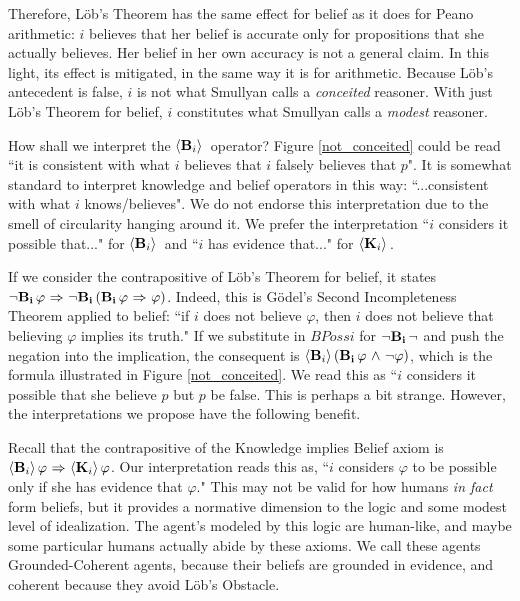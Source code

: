 Therefore, L\"ob's Theorem has the same effect for belief as it does for Peano arithmetic: $i$ believes that her belief is accurate only for propositions that she actually believes. Her belief in her own accuracy is not a general claim. In this light, its effect is mitigated, in the same way it is for arithmetic. Because L\"ob's antecedent is false, $i$ is not what Smullyan calls a \emph{conceited} reasoner. With just L\"ob's Theorem for belief, $i$ constitutes what Smullyan calls a \emph{modest} reasoner.

How shall we interpret the $\langle \mathbf{B}_{i} \rangle\,$ operator? Figure \ref{not_conceited} could be read ``it is consistent with what $i$ believes that $i$ falsely believes that $p$". It is somewhat standard to interpret knowledge and belief operators in this way: ``...consistent with what $i$ knows/believes".  We do not endorse this interpretation due to the smell of circularity hanging around it. We prefer the interpretation ``$i$ considers it possible that..." for $\langle \mathbf{B}_{i} \rangle\,$ and ``$i$ has evidence that..." for $\langle \mathbf{K}_{i} \rangle\,$. 

If we consider the contrapositive of L\"ob's Theorem for belief, it states ${\neg} \mathbf{B}_{\mathbf{i}}\, \varphi {\ \Rightarrow \ } {\neg}\mathbf{B}_{\mathbf{i}}\,(\mathbf{B}_{\mathbf{i}}\, \varphi {\ \Rightarrow \ } \varphi)$. Indeed, this is G\"odel's Second Incompleteness Theorem applied to belief: ``if $i$ does not believe $\varphi$, then $i$ does not believe that believing $\varphi$ implies its truth." If we substitute in $BPoss{i}$ for ${\neg}\mathbf{B}_{\mathbf{i}}\,{\neg}$ and push the negation into the implication, the consequent is $\langle \mathbf{B}_{i} \rangle\,(\mathbf{B}_{\mathbf{i}}\,\varphi {\ \wedge \ } {\neg} \varphi)$, which is the formula illustrated in Figure \ref{not_conceited}. We read this as ``$i$ considers it possible that she believe $p$ but $p$ be false. This is perhaps a bit strange. However, the interpretations we propose have the following benefit.

Recall that the contrapositive of the Knowledge implies Belief axiom is $\langle \mathbf{B}_{i} \rangle\,\varphi {\ \Rightarrow \ } \langle \mathbf{K}_{i} \rangle\,\varphi$. Our interpretation reads this as, ``$i$ considers $\varphi$ to be possible only if she has evidence that $\varphi$."  This may not be valid for how humans \emph{in fact} form beliefs, but it provides a normative dimension to the logic and some modest level of idealization. The agent's modeled by this logic are human-like, and maybe some particular humans actually abide by these axioms. We call these agents Grounded-Coherent agents, because their beliefs are grounded in evidence, and coherent because they avoid L\"ob's Obstacle.


